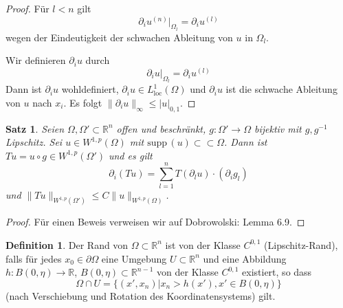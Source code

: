 \documentclass[
paper=a4,
bibtotocnumbered,
liststotocnumbered,
tablecaptionabove,
pointlessnumbers,
twoside,
openright,
10pt
]
{report}
\newcommand{\supp}{\mathrm{supp}\,}
\newtheorem{satz}[thm]{Satz}
\theoremstyle{definition}
\newtheorem*{df}{Definition}
\numberwithin{equation}{chapter}
\begin{document}
\begin{proof}
Für $l<n$ gilt 
\begin{equation}
  \partial_i u^{(n)} \big |_{\Omega_l} = \partial_i u^{(l)}
\end{equation}
wegen der Eindeutigkeit der schwachen Ableitung von $u$ in $\Omega_l$.

Wir definieren $\partial_i u$ durch
\begin{equation}
 \partial_i u\big |_{\Omega_l}  = \partial_i u^{(l)}
\end{equation}
Dann ist $\partial_i u$ wohldefiniert, $\partial_i u\in L^1_{\text{loc}}(\Omega)$ und $\partial_i u$ ist die schwache Ableitung von $u$ nach $x_i$. Es folgt $\|\partial_i u\|_\infty \le |u|_{0,1}$.
\end{proof}
\begin{satz}\label{4.5}
 Seien $\Omega, \Omega'\subset \mathbb R^n$ offen und beschränkt, $g: \Omega' \to \Omega$ bijektiv mit $g, g^{-1}$ Lipschitz. Sei $u\in W^{1,p}(\Omega)$ mit $\supp(u) \subset \subset \Omega$. Dann ist $Tu=u\circ g \in W^{1,p}(\Omega')$ und es gilt
 \begin{equation}
  \partial_i (Tu) = \sum_{l=1}^n T(\partial_l u) \cdot (\partial_i g_l)
 \end{equation}
und $\|Tu\|_{W^{1,p}(\Omega')} \le C\|u\|_{W^{1,p}(\Omega)}$.
\end{satz}
\begin{proof}
 Für einen Beweis verweisen wir auf Dobrowolski: Lemma 6.9.
\end{proof}

\begin{df}
 Der Rand von $\Omega \subset \mathbb R^n$ ist von der Klasse $C^{0,1}$ (Lipschitz-Rand), falls für jedes $x_0 \in \partial \Omega$ eine Umgebung $U\subset \mathbb R^n$ und eine Abbildung $h: B(0, \eta) \to \mathbb R$, $B(0,\eta) \subset \mathbb R^{n-1}$ von der Klasse $C^{0,1}$ existiert, so dass
 \begin{equation}
  \Omega \cap U = \{(x', x_n) | x_n > h(x'), x'\in B(0,\eta)\}
 \end{equation}
 (nach Verschiebung und Rotation des Koordinatensystems) gilt.
\end{df}
\end{document}
